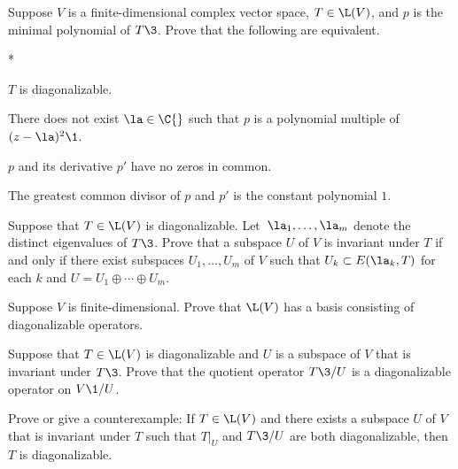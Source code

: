 \exercise
Suppose $V$ is a finite-dimensional complex vector space, $T \in \L(V)$, and $p$ is the minimal polynomial of $T\3$. Prove that the following are equivalent.\label{2gcd}
\begin{subtheorem}*
\item
$T$ is diagonalizable.
\item
There does not exist $\la \in \C{}$ such that $p$ is a polynomial multiple of $(z-\la)^2\1$.
\item
$p$ and its derivative $p'$ have no zeros in common.
\item
The greatest common divisor of $p$ and $p'$ is the constant polynomial $1$.
\end{subtheorem}


\exercise
Suppose that $T \in \L(V)$ is diagonalizable. Let~$\la_1, \ldots, \la_m$ denote the distinct eigenvalues of $T\3$. Prove that a subspace $U$ of $V$ is invariant under $T$ if and only if there exist subspaces $U_1, \ldots, U_m$ of $V$ such that
$U_k \subset E(\la_k, T)$ for each $k$ and
$
U = U_1 \oplus \cdots \oplus U_m$.


\exercise
Suppose $V$ is finite-dimensional. Prove that $\L(V)$ has a basis consisting of diagonalizable operators.\label{5basisdiag}


\exercise
Suppose that $T \in \L(V)$ is diagonalizable and $U$ is a subspace of $V$ that is invariant under $T\3$. Prove that the quotient operator $T\3/U$ is a diagonalizable operator on $V\1/U$.


\exercise
Prove or give a counterexample: If $T \in \L(V)$ and there exists a subspace $U$ of $V$ that is invariant under $T$ such that $T|_U$ and $T\3/U$ are both diagonalizable, then $T$ is diagonalizable.


